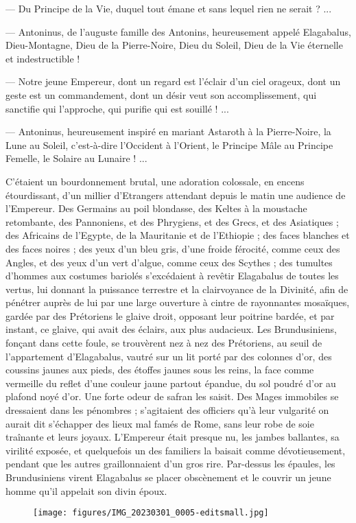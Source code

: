 \documentclass[a4paper, 11pt, oneside, polutonikogreek, french]{article}
\begin{document}
--- Du Principe de la Vie, duquel tout émane et sans lequel rien ne serait ? ...

--- Antoninus, de l'auguste famille des Antonins, heureusement appelé Elagabalus, Dieu-Montagne, Dieu de la Pierre-Noire, Dieu du Soleil, Dieu de la Vie éternelle et indestructible !

--- Notre jeune Empereur, dont un regard est l'éclair d'un ciel orageux, dont un geste est un commandement, dont un désir veut son accomplissement, qui sanctifie qui l'approche, qui purifie qui est souillé ! ...

--- Antoninus, heureusement inspiré en mariant Astaroth à la Pierre-Noire, la Lune au Soleil, c'est-à-dire l'Occident à l'Orient, le Principe Mâle au Principe Femelle, le Solaire au Lunaire ! ...

C'étaient un bourdonnement brutal, une adoration colossale, en encens étourdissant, d'un millier d'Etrangers attendant depuis le matin une audience de l'Empereur. Des Germains au poil blondasse, des Keltes à la moustache retombante, des Pannoniens, et des Phrygiens, et des Grecs, et des Asiatiques ; des Africains de l'Egypte, de la Mauritanie et de l'Ethiopie ; des faces blanches et des faces noires ; des yeux d'un bleu gris, d'une froide férocité, comme ceux des Angles, et des yeux d'un vert d'algue, comme ceux des Scythes ; des tumultes d'hommes aux costumes bariolés s'excédaient à revêtir Elagabalus de toutes les vertus, lui donnant la puissance terrestre et la clairvoyance de la Divinité, afin de pénétrer auprès de lui par une large ouverture à cintre de rayonnantes mosaïques, gardée par des Prétoriens le glaive droit, opposant leur poitrine bardée, et par instant, ce glaive, qui avait des éclairs, aux plus audacieux. Les Brundusiniens, fonçant dans cette foule, se trouvèrent nez à nez des Prétoriens, au seuil de l'appartement d'Elagabalus, vautré sur un lit porté par des colonnes d'or, des coussins jaunes aux pieds, des étoffes jaunes sous les reins, la face comme vermeille du reflet d'une couleur jaune partout épandue, du sol poudré d'or au plafond noyé d'or. Une forte odeur de safran les saisit. Des Mages immobiles se dressaient dans les pénombres ; s'agitaient des officiers qu'à leur vulgarité on aurait dit s'échapper des lieux mal famés de Rome, sans leur robe de soie traînante et leurs joyaux. L'Empereur était presque nu, les jambes ballantes, sa virilité exposée, et quelquefois un des familiers la baisait comme dévotieusement, pendant que les autres graillonnaient d'un gros rire. Par-dessus les épaules, les Brundusiniens virent Elagabalus se placer obscènement et le couvrir un jeune homme qu'il appelait son divin époux.
\clearpage
\pagestyle{fancy}
\fancyhf{}
\cfoot{\thepage}
\begin{figure}[H]
\centering
\texttt{[image: figures/IMG\_20230301\_0005-editsmall.jpg]}
\end{figure}
\clearpage
\pagestyle{plain}
\end{document}
